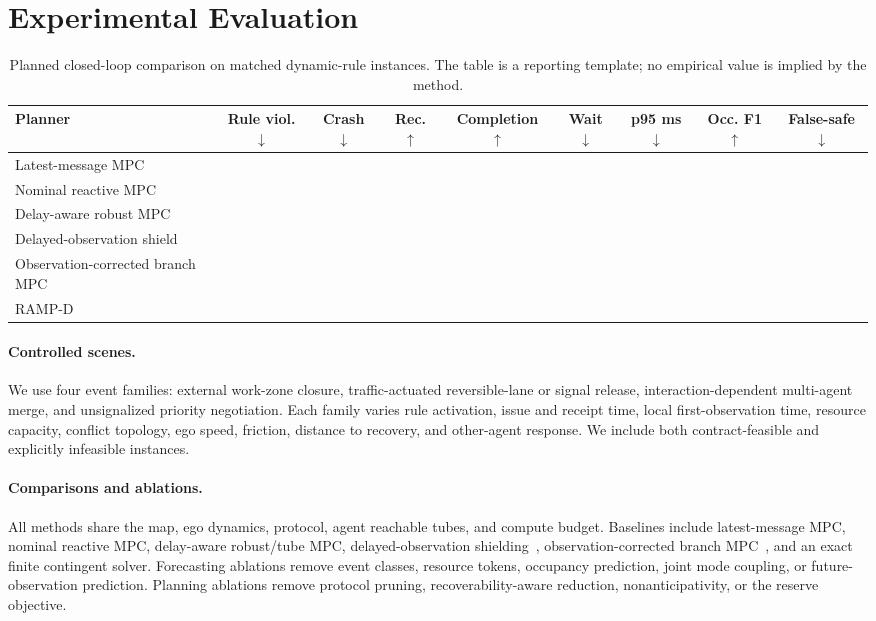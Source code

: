 \documentclass[letterpaper]{article} %
\newcommand{\RAMP}{\textsc{RAMP}}
\newcommand{\Result}{\textemdash}
\begin{document}
\section{Experimental Evaluation}
\label{sec:experiments}
\begin{table}[t]
\centering\small
\begin{tabular}{@{}lcccccccc@{}}
\toprule
Planner & Rule viol. $\downarrow$ & Crash $\downarrow$ & Rec. $\uparrow$ & Completion $\uparrow$ & Wait $\downarrow$ & p95 ms $\downarrow$ & Occ. F1 $\uparrow$ & False-safe $\downarrow$\\
\midrule
Latest-message MPC & \Result & \Result & \Result & \Result & \Result & \Result & \Result & \Result\\
Nominal reactive MPC & \Result & \Result & \Result & \Result & \Result & \Result & \Result & \Result\\
Delay-aware robust MPC & \Result & \Result & \Result & \Result & \Result & \Result & \Result & \Result\\
Delayed-observation shield & \Result & \Result & \Result & \Result & \Result & \Result & \Result & \Result\\
Observation-corrected branch MPC & \Result & \Result & \Result & \Result & \Result & \Result & \Result & \Result\\
\RAMP-D & \Result & \Result & \Result & \Result & \Result & \Result & \Result & \Result\\
\bottomrule
\end{tabular}
\caption{Planned closed-loop comparison on matched dynamic-rule instances. The table is a reporting template; no empirical value is implied by the method.}
\label{tab:main}
\end{table}

\paragraph{Controlled scenes.}
We use four event families: external work-zone closure, traffic-actuated reversible-lane or signal release, interaction-dependent multi-agent merge, and unsignalized priority negotiation. Each family varies rule activation, issue and receipt time, local first-observation time, resource capacity, conflict topology, ego speed, friction, distance to recovery, and other-agent response. We include both contract-feasible and explicitly infeasible instances.

\paragraph{Comparisons and ablations.}
All methods share the map, ego dynamics, protocol, agent reachable tubes, and compute budget. Baselines include latest-message MPC, nominal reactive MPC, delay-aware robust/tube MPC, delayed-observation shielding~\citep{cordoba2023safety}, observation-corrected branch MPC~\citep{chen2022interactive}, and an exact finite contingent solver. Forecasting ablations remove event classes, resource tokens, occupancy prediction, joint mode coupling, or future-observation prediction. Planning ablations remove protocol pruning, recoverability-aware reduction, nonanticipativity, or the reserve objective.
\end{document}
